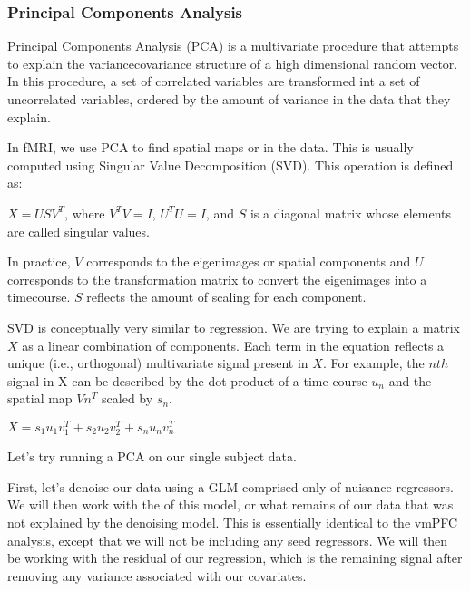 \documentclass[letterpaper,10pt,english]{sphinxmanual}
\begin{document}
\noindent{}


\subsubsection{Principal Components Analysis}
\label{\detokenize{content/Connectivity:principal-components-analysis}}
Principal Components Analysis (PCA) is a multivariate procedure that attempts to explain the variance\sphinxhyphen{}covariance structure of a high dimensional random vector. In this procedure, a set of correlated variables are transformed int a set of uncorrelated variables, ordered by the amount of variance in the data that they explain.

In fMRI, we use PCA to find spatial maps or  in the data. This is usually computed using Singular Value Decomposition (SVD). This operation is defined as:

\(X = USV^T\), where \(V^T V = I\), \(U^T U = I\), and \(S\) is a diagonal matrix whose elements are called singular values.

In practice, \(V\) corresponds to the eigenimages or spatial components and \(U\) corresponds to the transformation matrix to convert the eigenimages into a timecourse. \(S\) reflects the amount of scaling for each component.


SVD is conceptually very similar to regression. We are trying to explain a matrix \(X\) as a linear combination of components. Each term in the equation reflects a unique (i.e., orthogonal) multivariate signal present in \(X\). For example, the \(nth\) signal in X can be described by the dot product of a time course \(u_n\) and the spatial map \(Vn^T\)  scaled by \(s_n\).

\(X = s_1 u_1 v_1^T + s_2 u_2 v_2^T + s_n u_n v_n^T\)

Let’s try running a PCA on our single subject data.

First, let’s denoise our data using a GLM comprised only of nuisance regressors. We will then work with the  of this model, or what remains of our data that was not explained by the denoising model. This is essentially identical to the vmPFC analysis, except that we will not be including any seed regressors. We will then be working with the residual of our regression, which is the remaining signal after removing any variance associated with our covariates.
\end{document}
